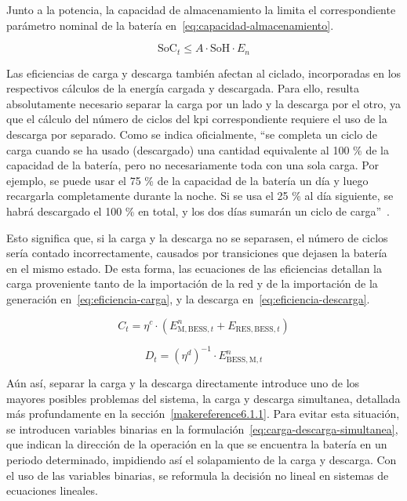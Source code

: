 Junto a la potencia, la capacidad de almacenamiento la limita el correspondiente parámetro nominal de la batería en~\ref{eq:capacidad-almacenamiento}.

\begin{equation}%
  \label{eq:capacidad-almacenamiento}
  \text{SoC}_{t} \le A \cdot \text{SoH} \cdot E_{n}
\end{equation}

Las eficiencias de carga y descarga también afectan al ciclado, incorporadas en los respectivos cálculos de la energía cargada y descargada. Para ello, resulta absolutamente necesario separar la carga por un lado y la descarga por el otro, ya que el cálculo del número de ciclos del \gls{kpi} correspondiente requiere el uso de la descarga por separado. Como se indica oficialmente, ``se completa un ciclo de carga cuando se ha usado (descargado) una cantidad equivalente al 100 \% de la capacidad de la batería, pero no necesariamente toda con una sola carga. Por ejemplo, se puede usar el 75 \% de la capacidad de la batería un día y luego recargarla completamente durante la noche. Si se usa el 25 \% al día siguiente, se habrá descargado el 100 \% en total, y los dos días sumarán un ciclo de carga''~\cite{apple2025batteries}.

Esto significa que, si la carga y la descarga no se separasen, el número de ciclos sería contado incorrectamente, causados por transiciones que dejasen la batería en el mismo estado. De esta forma, las ecuaciones de las eficiencias detallan la carga proveniente tanto de la importación de la red y de la importación de la generación en~\ref{eq:eficiencia-carga}, y la descarga en~\ref{eq:eficiencia-descarga}.

\begin{equation}%
  \label{eq:eficiencia-carga}
  C_{t} = \eta^{c} \cdot (E^{n}_{\text{M}, \text{BESS}, t} + E_{\text{RES}, \text{BESS}, t})
\end{equation}

\begin{equation}%
  \label{eq:eficiencia-descarga}
  D_{t} = {(\eta^{d})}^{-1} \cdot E^{n}_{\text{BESS}, \text{M}, t}
\end{equation}

Aún así, separar la carga y la descarga directamente introduce uno de los mayores posibles problemas del sistema, la carga y descarga simultanea, detallada más profundamente en la sección~\ref{makereference6.1.1}. Para evitar esta situación, se introducen variables binarias en la formulación~\ref{eq:carga-descarga-simultanea}, que indican la dirección de la operación en la que se encuentra la batería en un periodo determinado, impidiendo así el solapamiento de la carga y descarga. Con el uso de las variables binarias, se reformula la decisión no lineal en sistemas de ecuaciones lineales.

